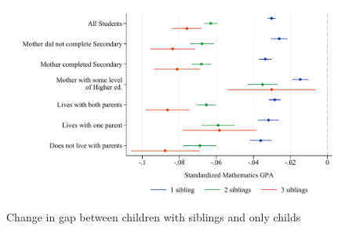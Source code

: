 \begin{figure}[htbp]
    \centering
    
        \includegraphics[width=\textwidth]{./FIGURES/TWFE/covid_twfe_D_bysibs_elm_all_gpa_m_adj_Tsiblings_Soldest_4.pdf}
        \caption{Change in gap between children with siblings and only childs}
        \label{fig:fig_appD}

\end{figure}




\newpage














